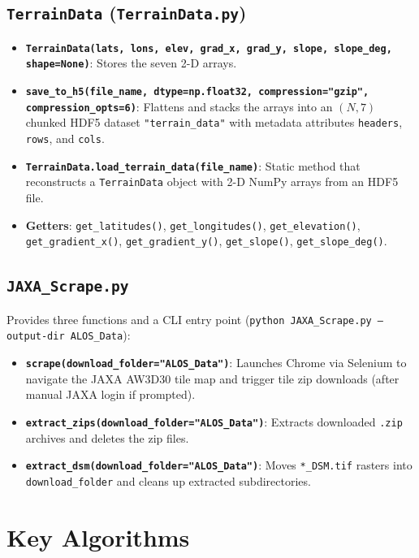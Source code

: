\documentclass[11pt,letterpaper]{article}
\begin{document}
\subsection{\texttt{TerrainData} (\texttt{TerrainData.py})}
\begin{itemize}
  \item \textbf{\texttt{TerrainData(lats, lons, elev, grad\_x, grad\_y, slope, slope\_deg, shape=None)}}: Stores the seven 2-D arrays.
  \item \textbf{\texttt{save\_to\_h5(file\_name, dtype=np.float32, compression="gzip", compression\_opts=6)}}: Flattens and stacks the arrays into an $(N, 7)$ chunked HDF5 dataset \texttt{"terrain\_data"} with metadata attributes \texttt{headers}, \texttt{rows}, and \texttt{cols}.
  \item \textbf{\texttt{TerrainData.load\_terrain\_data(file\_name)}}: Static method that reconstructs a \texttt{TerrainData} object with 2-D NumPy arrays from an HDF5 file.
  \item \textbf{Getters}: \texttt{get\_latitudes()}, \texttt{get\_longitudes()}, \texttt{get\_elevation()}, \texttt{get\_gradient\_x()}, \texttt{get\_gradient\_y()}, \texttt{get\_slope()}, \texttt{get\_slope\_deg()}.
\end{itemize}

\subsection{\texttt{JAXA\_Scrape.py}}
Provides three functions and a CLI entry point (\texttt{python JAXA\_Scrape.py --output-dir ALOS\_Data}):
\begin{itemize}
  \item \textbf{\texttt{scrape(download\_folder="ALOS\_Data")}}: Launches Chrome via Selenium to navigate the JAXA AW3D30 tile map and trigger tile zip downloads (after manual JAXA login if prompted).
  \item \textbf{\texttt{extract\_zips(download\_folder="ALOS\_Data")}}: Extracts downloaded \texttt{.zip} archives and deletes the zip files.
  \item \textbf{\texttt{extract\_dsm(download\_folder="ALOS\_Data")}}: Moves \texttt{*\_DSM.tif} rasters into \texttt{download\_folder} and cleans up extracted subdirectories.
\end{itemize}

\section{Key Algorithms}
\end{document}
